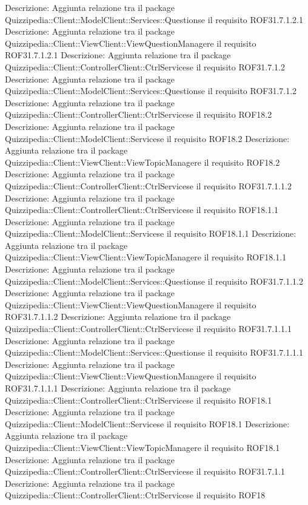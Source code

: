 Descrizione: Aggiunta relazione tra il package Quizzipedia::Client::ModelClient::Services::Questionse il requisito ROF31.7.1.2.1 
Descrizione: Aggiunta relazione tra il package Quizzipedia::Client::ViewClient::ViewQuestionManagere il requisito ROF31.7.1.2.1 
Descrizione: Aggiunta relazione tra il package Quizzipedia::Client::ControllerClient::CtrlServicese il requisito ROF31.7.1.2 
Descrizione: Aggiunta relazione tra il package Quizzipedia::Client::ModelClient::Services::Questionse il requisito ROF31.7.1.2 
Descrizione: Aggiunta relazione tra il package Quizzipedia::Client::ControllerClient::CtrlServicese il requisito ROF18.2 
Descrizione: Aggiunta relazione tra il package Quizzipedia::Client::ModelClient::Servicese il requisito ROF18.2 
Descrizione: Aggiunta relazione tra il package Quizzipedia::Client::ViewClient::ViewTopicManagere il requisito ROF18.2 
Descrizione: Aggiunta relazione tra il package Quizzipedia::Client::ControllerClient::CtrlServicese il requisito ROF31.7.1.1.2 
Descrizione: Aggiunta relazione tra il package Quizzipedia::Client::ControllerClient::CtrlServicese il requisito ROF18.1.1 
Descrizione: Aggiunta relazione tra il package Quizzipedia::Client::ModelClient::Servicese il requisito ROF18.1.1 
Descrizione: Aggiunta relazione tra il package Quizzipedia::Client::ViewClient::ViewTopicManagere il requisito ROF18.1.1 
Descrizione: Aggiunta relazione tra il package Quizzipedia::Client::ModelClient::Services::Questionse il requisito ROF31.7.1.1.2 
Descrizione: Aggiunta relazione tra il package Quizzipedia::Client::ViewClient::ViewQuestionManagere il requisito ROF31.7.1.1.2 
Descrizione: Aggiunta relazione tra il package Quizzipedia::Client::ControllerClient::CtrlServicese il requisito ROF31.7.1.1.1 
Descrizione: Aggiunta relazione tra il package Quizzipedia::Client::ModelClient::Services::Questionse il requisito ROF31.7.1.1.1 
Descrizione: Aggiunta relazione tra il package Quizzipedia::Client::ViewClient::ViewQuestionManagere il requisito ROF31.7.1.1.1 
Descrizione: Aggiunta relazione tra il package Quizzipedia::Client::ControllerClient::CtrlServicese il requisito ROF18.1 
Descrizione: Aggiunta relazione tra il package Quizzipedia::Client::ModelClient::Servicese il requisito ROF18.1 
Descrizione: Aggiunta relazione tra il package Quizzipedia::Client::ViewClient::ViewTopicManagere il requisito ROF18.1 
Descrizione: Aggiunta relazione tra il package Quizzipedia::Client::ControllerClient::CtrlServicese il requisito ROF31.7.1.1 
Descrizione: Aggiunta relazione tra il package Quizzipedia::Client::ControllerClient::CtrlServicese il requisito ROF18 
